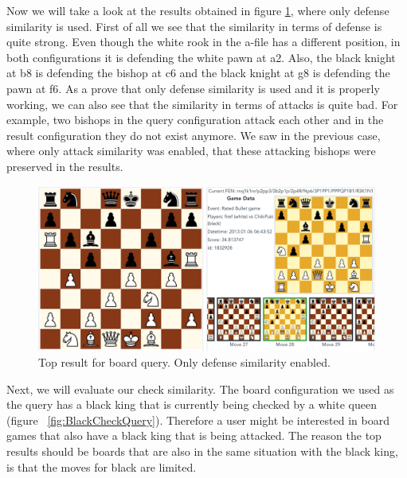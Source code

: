 \documentclass[11pt]{article}
\begin{document}
    Now we will take a look at the results obtained in figure \ref{fig:Defense}, where only defense similarity is used. First of all we see that the similarity in terms of defense is quite strong. Even though the white rook in the a-file has a different position, in both configurations it is defending the white pawn at a2. Also, the black knight at b8 is defending the bishop at c6 and the black knight at g8 is defending the pawn at f6. As a prove that only defense similarity is used and it is properly working, we can also see that the similarity in terms of attacks is quite bad. For example, two bishops in the query configuration attack each other and in the result configuration they do not exist anymore. We saw in the previous case, where only attack similarity was enabled, that these attacking bishops were preserved in the results.

    \begin{figure}[H]
        \centering
        \includegraphics[width=12cm]{images/Defense}
        \caption{Top result for board query. Only defense similarity enabled.}
        \label{fig:Defense}
    \end{figure}

    Next, we will evaluate our check similarity. The board configuration we used as the query has a black king that is currently being checked by a white queen (figure ~\ref{fig:BlackCheckQuery}). Therefore a user might be interested in board games that also have a black king that is being attacked. The reason the top results should be boards that are also in the same situation with the black king, is that the moves for black are limited.
\end{document}
